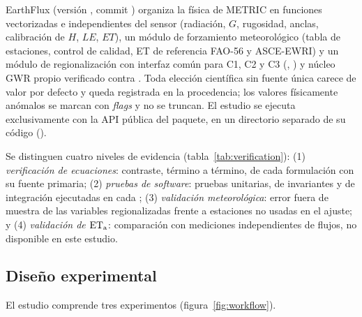 EarthFlux (versión \EarthFluxVersion, commit \texttt{\EarthFluxCommit})
organiza la física de METRIC en funciones vectorizadas e independientes del
sensor (radiación, $G$, rugosidad, anclas, calibración de $H$, $LE$, $ET$),
un módulo de forzamiento meteorológico (tabla de estaciones, control de
calidad, ET de referencia FAO-56 y ASCE-EWRI) y un módulo de
regionalización con interfaz común para C1, C2 y C3 (,
) y núcleo GWR propio verificado contra
 \parencite{gollini2015gwmodel}. Toda elección científica sin
fuente única carece de valor por defecto y queda registrada en la
procedencia; los valores físicamente anómalos se marcan con \emph{flags} y
no se truncan. El estudio se ejecuta exclusivamente con la API pública del
paquete, en un directorio separado de su código ().

Se distinguen cuatro niveles de evidencia (tabla~\ref{tab:verification}):
(1) \emph{verificación de ecuaciones}: contraste, término a término, de cada
formulación con su fuente primaria; (2) \emph{pruebas de software}:
pruebas unitarias, de invariantes y de integración ejecutadas en cada
; (3) \emph{validación meteorológica}: error fuera de
muestra de las variables regionalizadas frente a estaciones no usadas en el
ajuste; y (4) \emph{validación de $\mathrm{ET_a}$}: comparación con mediciones
independientes de flujos, no disponible en este estudio.

\subsection{Diseño experimental}\label{sec:design}

El estudio comprende tres experimentos (figura~\ref{fig:workflow}).

